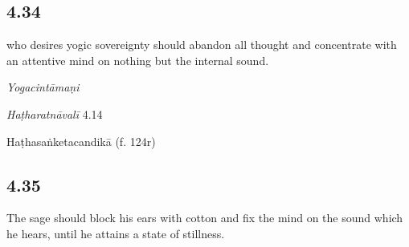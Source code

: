 \begin{ekdosis}
\subsection*{4.34}
\begin{translation} who desires yogic sovereignty should abandon all thought and concentrate with an attentive mind on nothing but the internal sound.
\end{translation}


\begin{testimonia}[hp04_034]
\emph{Yogacintāmaṇi}
\begin{versinnote}
\end{versinnote}

\emph{Haṭharatnāvalī} 4.14
\begin{versinnote}
\end{versinnote}

Haṭhasaṅketacandikā (f. 124r)
\begin{versinnote}
\end{versinnote}
\end{testimonia}


\subsection*{4.35}
\begin{translation}[hp04_035]
The sage should block his ears with cotton and fix the mind on the sound which he hears, until he attains a state of stillness.
\end{translation}


\end{ekdosis}

